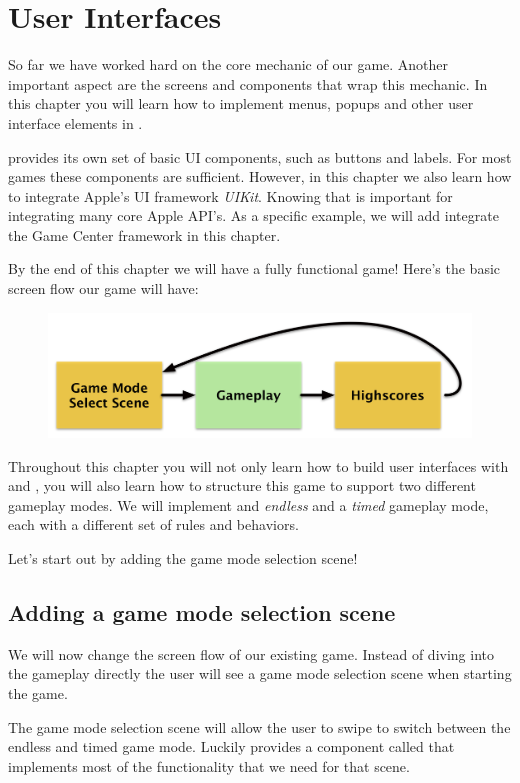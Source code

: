 \chapter{User Interfaces}

So far we have worked hard on the core mechanic of our game. Another important
aspect are the screens and components that wrap this mechanic. In this chapter
you will learn how to implement menus, popups and other user interface elements
in \cocos{}. 

\cocos{} provides its own set of basic UI components, such as buttons and
labels. For most games these components are sufficient. However, in this chapter
we also learn how to integrate Apple's UI framework \textit{UIKit}. Knowing
that is important for integrating many core Apple API's. As a specific example,
we will add integrate the Game Center framework in this chapter.

By the end of this chapter we will have a fully functional game!
Here's the basic screen flow our game will have:

\begin{figure}[H]
		\centering
		\includegraphics[width=0.7\linewidth]{images/Chapter6/screen_flow.png}
\end{figure}

Throughout this chapter you will not only learn how to build user interfaces
with \cocos{} and \SB{}, you will also learn how to structure this game to
support two different gameplay modes. We will implement and \textit{endless} and
a \textit{timed} gameplay mode, each with a different set of rules and
behaviors.

Let's start out by adding the game mode selection scene!

\section{Adding a game mode selection scene}
We will now change the screen flow of our existing game. Instead of diving into
the gameplay directly the user will see a game mode selection scene when
starting the game. 

The game mode selection scene will allow the user to swipe to switch between the
endless and timed game mode. Luckily \cocos{} provides a component called
 that implements
most of the functionality that we need for that scene.

